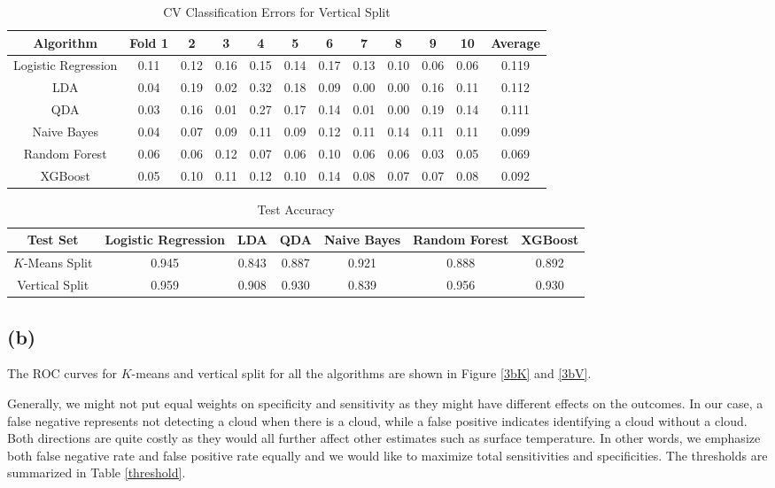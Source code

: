 \documentclass[11pt]{article}
\theoremstyle{definition}
\begin{document}
\begin{table}[h]
    \centering
    \begin{tabular}{c||c|c|c|c|c|c|c|c|c|c|c}
    Algorithm & Fold 1 & 2 & 3 & 4 & 5 & 6 & 7 & 8 & 9 & 10 & Average \\
    \hline
    \hline
    Logistic Regression & 0.11 & 0.12 & 0.16 & 0.15 & 0.14 & 0.17 & 0.13 & 0.10 & 0.06 & 0.06 & 0.119 \\
    \hline
    LDA & 0.04 & 0.19 & 0.02 & 0.32 & 0.18 & 0.09 & 0.00 & 0.00 & 0.16 & 0.11 & 0.112 \\
    \hline
    QDA & 0.03 & 0.16 & 0.01 & 0.27 & 0.17 & 0.14 & 0.01 & 0.00 & 0.19 & 0.14 & 0.111 \\
    \hline
    Naive Bayes & 0.04 & 0.07 & 0.09 & 0.11 & 0.09 & 0.12 & 0.11 & 0.14 & 0.11 & 0.11 & 0.099 \\
    \hline
    Random Forest & 0.06 & 0.06 & 0.12 & 0.07 & 0.06 & 0.10 & 0.06 & 0.06 & 0.03 & 0.05 & 0.069 \\
    \hline
    XGBoost & 0.05 & 0.10 & 0.11 & 0.12 & 0.10 & 0.14 & 0.08 & 0.07 & 0.07 & 0.08 & 0.092

    \end{tabular}
    \caption{CV Classification Errors for Vertical Split}
    \label{CVV}
\end{table}
\FloatBarrier

\begin{table}[h]
    \centering
    \begin{tabular}{c||c|c|c|c|c|c}
    Test Set & Logistic Regression
    & LDA
    & QDA & Naive Bayes & Random Forest & XGBoost \\
    \hline
    \hline
    $K$-Means Split
    & 0.945 & 0.843 & 0.887 & 0.921 & 0.888 & 0.892\\
    \hline
    Vertical Split
    & 0.959
    & 0.908 & 0.930 & 0.839 & 0.956 & 0.930

    \end{tabular}
    \caption{Test Accuracy}
    \label{Test}
\end{table}
\FloatBarrier

\subsection*{(b)}
The ROC curves for $K$-means and vertical split for all the algorithms are shown in Figure \ref{3bK} and \ref{3bV}.

Generally, we might not put equal weights on specificity and sensitivity as they might have different effects on the outcomes. In our case, a false negative represents not detecting a cloud when there is a cloud, while a false positive indicates identifying a cloud without a cloud. Both directions are quite costly as they would all further affect other estimates such as surface temperature. In other words, we emphasize both false negative rate and false positive rate equally and we would like to maximize total sensitivities and specificities. The thresholds are summarized in Table \ref{threshold}.
\end{document}
